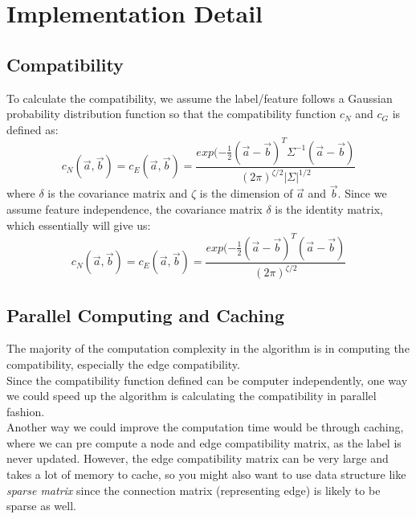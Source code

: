 \section{Implementation Detail}

\subsection{Compatibility}
\label{ssec:compatibility}

To calculate the compatibility, we assume the label/feature follows a Gaussian probability distribution function so that the compatibility function $c_N$ and $c_G$ is defined as:
\begin{equation} 
c_N( \overrightarrow{a}, \overrightarrow{b} )=c_E( \overrightarrow{a}, \overrightarrow{b})=\frac{exp(-\frac{1}{2}(\overrightarrow{a}-\overrightarrow{b})^{T}\Sigma^{-1}(\overrightarrow{a}-\overrightarrow{b})}{(2\pi)^{\zeta/2}|\Sigma|^{1/2}}
\end{equation}
where $\delta$ is the covariance matrix and $\zeta$ is the dimension of $\overrightarrow{a}$ and $\overrightarrow{b}$. Since we assume feature independence, the covariance matrix $\delta$ is the identity matrix, which essentially will give us:
\begin{equation} 
c_N( \overrightarrow{a}, \overrightarrow{b} )=c_E( \overrightarrow{a}, \overrightarrow{b})=\frac{exp(-\frac{1}{2}(\overrightarrow{a}-\overrightarrow{b})^{T}(\overrightarrow{a}-\overrightarrow{b})}{(2\pi)^{\zeta/2}}
\end{equation}

\subsection{Parallel Computing and Caching}

The majority of the computation complexity in the algorithm is in computing the compatibility, especially the edge compatibility.\\

Since the compatibility function defined can be computer independently, one way we could speed up the algorithm is calculating the compatibility in parallel fashion.\\

Another way we could improve the computation time would be through caching, where we can pre compute a node and edge compatibility matrix, as the label is never updated. However, the edge compatibility matrix can be very large and takes a lot of memory to cache, so you might also want to use data structure like \emph{sparse matrix} since the connection matrix (representing edge) is likely to be sparse as well.

